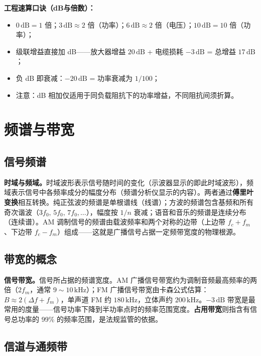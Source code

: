 \documentclass[12pt,UTF8]{ctexbook}
\begin{document}
\textbf{工程速算口诀（dB与倍数）：}
\begin{itemize}
  \item $0\,\mathrm{dB} = 1$ 倍；$3\,\mathrm{dB} \approx 2$ 倍（功率）；$6\,\mathrm{dB} \approx 2$ 倍（电压）；$10\,\mathrm{dB} = 10$ 倍（功率）；
  \item 级联增益直接加 dB——放大器增益 $20\,\mathrm{dB}$ + 电缆损耗 $-3\,\mathrm{dB}$ = 总增益 $17\,\mathrm{dB}$；
  \item 负 dB 即衰减：$-20\,\mathrm{dB}$ = 功率衰减为 $1/100$；
  \item 注意：dB 相加仅适用于同负载阻抗下的功率增益，不同阻抗间须折算。
\end{itemize}

\section{频谱与带宽}
\label{sec:spectrum_bandwidth}

\subsection{信号频谱}

\textbf{时域与频域。}时域波形表示信号随时间的变化（示波器显示的即此时域波形），频域表示信号中各频率成分的幅度分布（频谱分析仪显示的内容）。两者通过\textbf{傅里叶变换}相互转换。纯正弦波的频谱是单根谱线（线谱）；方波的频谱包含基频和所有奇次谐波（$3f_0,\,5f_0,\,7f_0,\ldots$），幅度按 $1/n$ 衰减；语音和音乐的频谱是连续分布（连续谱）。AM 调制信号的频谱由载波频率和两个对称的边带（上边带 $f_c+f_m$、下边带 $f_c-f_m$）组成——这就是广播信号占据一定频带宽度的物理根源。

\subsection{带宽的概念}

\textbf{信号带宽。}信号所占据的频谱宽度。AM 广播信号带宽约为调制音频最高频率的两倍（$2f_m$，通常 $9\sim10\,\mathrm{kHz}$）；FM 广播信号带宽由卡森公式估算：$B \approx 2(\Delta f + f_m)$，单声道 FM 约 $180\,\mathrm{kHz}$，立体声约 $200\,\mathrm{kHz}$。$-3\,\mathrm{dB}$ 带宽是最常用的度量——信号功率下降到半功率点时的频率范围宽度。\textbf{占用带宽}则指含有信号总功率的 99\% 的频率范围，是法规监管的依据。

\subsection{信道与通频带}
\end{document}
